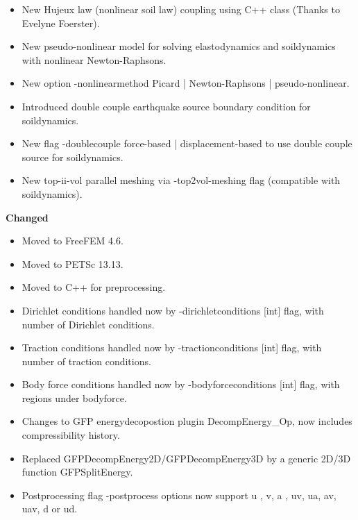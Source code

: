 \documentclass{report}
\begin{document}
\begin{itemize}
    \item New Hujeux law (nonlinear soil law) coupling using C++ class (Thanks to Evelyne Foerster).
    \item New pseudo-nonlinear model for solving elastodynamics and soildynamics with nonlinear Newton-Raphsons.
    \item New option {\ttfamily -nonlinearmethod Picard | Newton-Raphsons | pseudo-nonlinear}.
    \item Introduced double couple earthquake source boundary condition for soildynamics.
    \item New flag {\ttfamily -doublecouple force-based | displacement-based }  to use double couple source for soildynamics.
    \item New top-ii-vol parallel meshing via {\ttfamily -top2vol-meshing} flag (compatible with soildynamics).    
\end{itemize}


\textbf{Changed}
\begin{itemize}
\item Moved to FreeFEM 4.6.
\item Moved to PETSc 13.13.
\item Moved to C++ for preprocessing.
\item Dirichlet conditions handled now by {\ttfamily -dirichletconditions [int]} flag, with {\ttfamily  [int]} number of Dirichlet conditions.
\item Traction conditions handled now by {\ttfamily -tractionconditions [int]} flag, with {\ttfamily  [int]} number of traction conditions.
\item Body force conditions handled now by {\ttfamily -bodyforceconditions [int]} flag, with {\ttfamily  [int]} regions under bodyforce.
\item Changes to GFP energydecopostion plugin {\ttfamily DecompEnergy\_Op}, now includes compressibility history.
\item Replaced GFPDecompEnergy2D/GFPDecompEnergy3D by a generic 2D/3D function {\ttfamily GFPSplitEnergy}.
\item Postprocessing flag {\ttfamily -postprocess} options now support  {\ttfamily u} , {\ttfamily v},  {\ttfamily a} , {\ttfamily uv}, {\ttfamily ua}, {\ttfamily av}, {\ttfamily uav}, {\ttfamily d} or {\ttfamily ud}.

\end{itemize}
\end{document}
